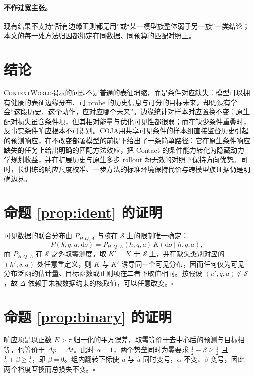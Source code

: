 \documentclass[UTF8,zihao=-4,fontset=fandol]{ctexart}
\newcommand{\method}{\textsc{COJA}}
\newcommand{\benchmark}{\textsc{ContextWorld}}
\begin{document}
\paragraph{不作过宽主张。}
现有结果不支持“所有边缘正则都无用”或“某一模型族整体弱于另一族”一类结论；本文的每一处方法归因都绑定在同数据、同预算的匹配对照上。

\section{结论}

\benchmark 揭示的问题不是普通的表征坍缩，而是条件对应缺失：模型可以拥有健康的表征边缘分布、可 probe 的历史信息与可分的目标未来，却仍没有学会“这段历史、这个动作，应对应哪个未来”。边缘统计对样本对应置换不变；原生配对损失虽含条件项，但其相对能量与优化可见性都很弱；而在缺少条件重叠时，反事实条件响应根本不可识别。\method 用共享可见条件的样本组直接监督历史引起的预测响应，在不改变部署模型的前提下给出了一条简单路径：它在原生条件响应缺失的任务上给出明确的匹配方法效应，把 Contact 的条件能力转化为隐藏动力学规划收益，并在扩展历史与原生多步 rollout 均无效的对照下保持方向优势。同时，长训练的响应尺度校准、一步方法的标准环境保持代价与跨模型族证据仍是明确边界。

\appendix

\section{命题 \ref{prop:ident} 的证明}
\label{app:proof}

可见数据的联合分布由 $P_{H,Q,A}$ 与核在 $\mathcal{S}$ 上的限制唯一确定：
\begin{equation}
  P(h,q,a,\mathrm{d}o)=P_{H,Q,A}(h,q,a)\,K(\mathrm{d}o\mid h,q,a),
\end{equation}
而 $P_{H,Q,A}$ 在 $\mathcal{S}$ 之外取零测度。取 $K'=K$ 于 $\mathcal{S}$ 上，并在缺失类别对应的 $(h',q,a)$ 处任意重定义，则 $K$ 与 $K'$ 诱导同一个可见分布，因而任何仅为可见分布泛函的估计量、目标函数或正则项在二者下取值相同。按假设 $(h',q,a)\notin\mathcal{S}$，故 $\Delta$ 依赖于未被数据约束的核取值，可以任意改变。$\square$

\section{命题 \ref{prop:binary} 的证明}
\label{app:binary}

响应项是以正数 $E>\tau$ 归一化的平方误差，取零等价于去中心后的预测与目标相等，也等价于 $\Delta p=\Delta t$。此时 $\alpha=1$，两个势垒同时为零要求 $\tfrac12-\beta\ge\tfrac12$ 且 $\tfrac12+\beta\ge\tfrac12$，即 $\beta=0$。组内翻转下标使 $u$ 与 $\hat u$ 同时变号，$\alpha$ 不变、$\beta$ 变号，因此两个裕度互换而总损失不变。$\square$
\end{document}
